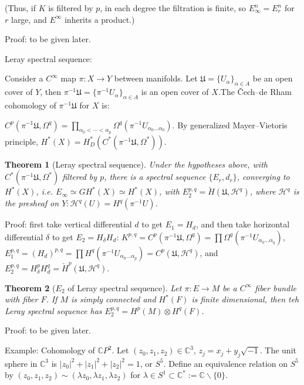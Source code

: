\documentclass{article}
\theoremstyle{mystyle}
\newtheorem*{theorem*}{Theorem}
\theoremstyle{remark}
\numberwithin{equation}{section}
\begin{document}
(Thus, if $K$ is filtered by $p$, in each degree the filtration is finite, so $E_\infty^n= E^n_r$ for $r$ large, and $E^\infty$ inherits a product.)

Proof: to be given later.

Leray spectral sequence:

Consider a $C^\infty$ map $\pi\colon X\rightarrow Y$ between manifolds. Let $\mathfrak{U} = \{U_\alpha\}_{\alpha \in A}$ be an open cover of $Y$, then $\pi^{-1}\mathfrak{U} = \{\pi^{-1}U_\alpha\}_{\alpha \in A}$ is an open cover of $X$.The Čech--de Rham cohomology of $\pi^{-1}\mathfrak{U}$ for $X$ is:

$C^p(\pi^{-1}\mathfrak{U},\Omega^q) = \prod_{\alpha_0<\cdots<\alpha_p}\Omega^q(\pi^{-1}U_{\alpha_0...\alpha_0})$. By generalized Mayer--Vietoris principle, $H^*(X) = H^*_D(C^*(\pi^{-1}\mathfrak{U},\Omega^*))$. 

\begin{theorem*}[Leray spectral sequence]
Under the hypotheses above, with $C^*(\pi^{-1}\mathfrak{U},\Omega^*)$ filtered by $p$, there is a spectral sequence $\{E_r,d_r\}$, converging to $H^*(X)$, i.e. $E_\infty\simeq GH^*(X)\simeq H^*(X)$, with $E_2^{p,q} = \check{H}(\mathfrak{U},\mathcal{H}^q)$, where $\mathcal{H}^q$ is the presheaf on $Y\colon \mathcal{H}^q(U) = H^q(\pi^{-1}U)$.
\end{theorem*}

Proof: first take vertical differential $d$ to get $E_1=H_d$, and then take horizontal differential $\delta$ to get $E_2 = H_\delta H_d$: $K^{p,q} = C^p(\pi^{-1}\mathfrak{U},\Omega^q) = \prod \Omega^q(\pi^{-1}U_{\alpha_0...\alpha_q})$, $E_1^{p,q} = (H_d)^{p,q} = \prod H^q(\pi^{-1}U_{\alpha_0...\alpha_p})=C^p(\mathfrak{U},\mathcal{H}^q)$, and $E_2^{p,q} = H_\delta^pH_d^q = \check{H}^p(\mathfrak{U},\mathcal{H}^q)$. 

\begin{theorem*}[$E_2$ of Leray spectral sequence]
Let $\pi\colon E\rightarrow M$ be a $C^\infty$ fiber bundle with fiber $F$. If $M$ is simply connected and $H^*(F)$ is finite dimensional, then teh Leray spectral sequence has $E_2^{p,q} =  H^p(M)\otimes H^q(F)$.
\end{theorem*}

Proof: to be given later.

Example: Cohomology of $\mathbb{C}P^2$. Let $(z_0,z_1,z_2)\in \mathbb{C}^3$, $z_j = x_j+y_j \sqrt{-1}$. The unit sphere in $\mathbb{C}^3$ is $|z_0|^2+|z_1|^2+|z_2|^2 = 1$, or $S^5$. Define an equivalence relation on $S^5$ by $(z_0,z_1,z_2)\sim (\lambda z_0,\lambda z_1,\lambda z_2)$ for $\lambda \in S^1 \subset \mathbb{C}^* :=\mathbb{C}\backslash \{0\}$. 
\end{document}
